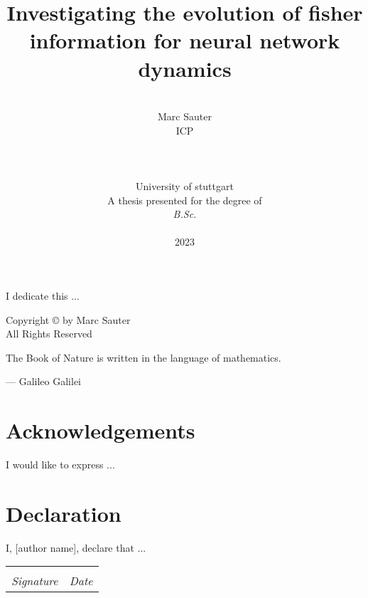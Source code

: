 \documentclass[12pt, a4paper]{report}
\date{}
\title{Investigating the evolution of fisher information for neural network dynamics}
\author{\\ \Large{Marc Sauter}
	\\ ICP
	\\
	\\
	\\
	\\ University of stuttgart
	\\
	A thesis presented for the degree of \\ \textit{B.Sc.}
	\\ \\
	2023
}
\begin{document}
	\thispagestyle{headings}
	\maketitle
	\FloatBarrier
	
	\newpage
	\thispagestyle{empty}
	\begin{center}
		I dedicate this ...
	\end{center}
	
	\newpage
	\thispagestyle{empty}
	\vspace*{\fill}
	\begin{center}
		Copyright \copyright  {} by Marc Sauter \\ All Rights Reserved
	\end{center}
	\vspace*{\fill}
	\newpage
	\thispagestyle{empty}
	\epigraph{The Book of Nature is written in the language of mathematics.}{--- \textup{Galileo Galilei}}
	
	\thispagestyle{empty}
	\chapter*{Acknowledgements}
	I would like to express ...
	
	
	\thispagestyle{empty}
	\chapter*{Declaration}
	I, [author name], declare that ...
	
	\vspace{3cm}
	\noindent\begin{tabular}{ll}
		\makebox[2.5in]{\hrulefill} & \makebox[2.5in]{\hrulefill}\\
		\textit{Signature} & \textit{Date}\\
	\end{tabular}
	
	\thispagestyle{empty}
	\begin{abstract}
		\lipsum[1-2]
		
	\end{abstract}
	\tableofcontents
	\thispagestyle{plain}
	\listoffigures
	\listoftables
	
\end{document}
